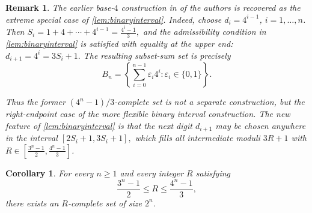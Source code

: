 \documentclass[11pt]{article}
\newtheorem{corollary}[theorem]{Corollary}
\newtheorem{remark}[theorem]{Remark}
\begin{document}
	\begin{remark}\label{rem:basefour}
		The earlier base-$4$ construction in \cite{CsajbokNagy2025} of the authors  is recovered as the extreme special case of \cref{lem:binaryinterval}. Indeed, choose
		$d_i=4^{i-1}$, $i=1,\ldots,n$.
		Then
		$ S_i=1+4+\cdots+4^{i-1}=\frac{4^i-1}{3},$
		and the admissibility condition in \cref{lem:binaryinterval} is satisfied with equality at the upper end:
		$ d_{i+1}=4^i=3S_i+1.$
		The resulting subset-sum  set is precisely
		\[
		B_n=\left\{\sum_{i=0}^{n-1}\varepsilon_i4^i:
		\varepsilon_i\in\{0,1\}\right\}.
		\]
		
		Thus the former $(4^n-1)/3$-complete  set is not a separate construction, but the right-endpoint case of the more flexible binary interval construction.  The new feature of \cref{lem:binaryinterval} is that the next digit $d_{i+1}$ may be chosen anywhere in the interval
		$ [2S_i+1,  3S_i+1],$
		which fills all intermediate moduli $3R+1$ with
		$R\in  [ \frac{3^n-1}{2}, \frac{4^n-1}{3}]$.
	\end{remark}
	
	\begin{corollary}\label{cor:manybinaryseeds}
		For every $n\ge1$ and every integer $R$ satisfying
		\[
		\frac{3^n-1}{2}\le R\le \frac{4^n-1}{3},
		\]
		there exists an $R$-complete set  of size $2^n$.
	\end{corollary}
	
\end{document}
